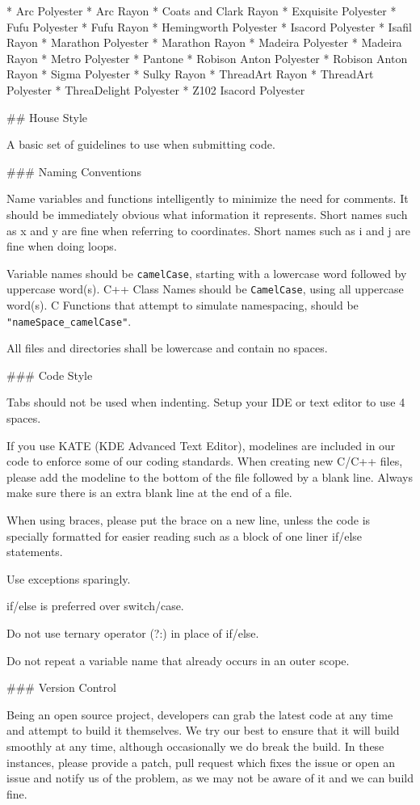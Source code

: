 * Arc Polyester
* Arc Rayon
* Coats and Clark Rayon
* Exquisite Polyester
* Fufu Polyester
* Fufu Rayon
* Hemingworth Polyester
* Isacord Polyester
* Isafil Rayon
* Marathon Polyester
* Marathon Rayon
* Madeira Polyester
* Madeira Rayon
* Metro Polyester
* Pantone
* Robison Anton Polyester
* Robison Anton Rayon
* Sigma Polyester
* Sulky Rayon
* ThreadArt Rayon
* ThreadArt Polyester
* ThreaDelight Polyester
* Z102 Isacord Polyester

## House Style

A basic set of guidelines to use when submitting code.

### Naming Conventions

Name variables and functions intelligently to minimize the need for comments.
It should be immediately obvious what information it represents.
Short names such as x and y are fine when referring to coordinates.
Short names such as i and j are fine when doing loops.

Variable names should be \texttt{camelCase}, starting with a lowercase word followed by uppercase word(s).
C++ Class Names should be \texttt{CamelCase}, using all uppercase word(s).
C Functions that attempt to simulate namespacing, should be \texttt{"nameSpace\_camelCase"}.

All files and directories shall be lowercase and contain no spaces.

### Code Style

Tabs should not be used when indenting. Setup your IDE or text editor to use 4 spaces.

If you use KATE (KDE Advanced Text Editor), modelines are included in our code to enforce 
some of our coding standards. When creating new C/C++ files, please add
the modeline to the bottom of the file followed by a blank line. Always make sure there
is an extra blank line at the end of a file.

When using braces, please put the brace on a new line, unless the code is specially formatted
for easier reading such as a block of one liner if/else statements.

Use exceptions sparingly.

if/else is preferred over switch/case.

Do not use ternary operator (?:) in place of if/else.

Do not repeat a variable name that already occurs in an outer scope.

### Version Control

Being an open source project, developers can grab the latest code at any time
and attempt to build it themselves. We try our best to ensure that it will build smoothly
at any time, although occasionally we do break the build. In these instances,
please provide a patch, pull request which fixes the issue or open an issue and
notify us of the problem, as we may not be aware of it and we can build fine.

